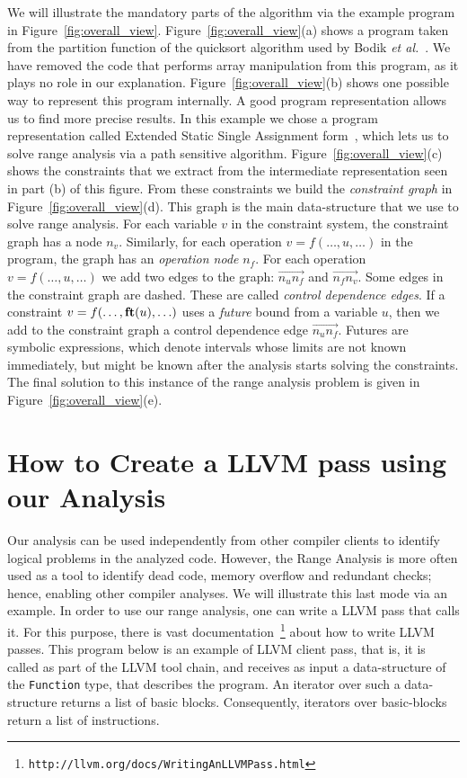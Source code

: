 \documentclass{paper}
\newcommand{\fun}[1]{\mbox{\textbf{#1}}}
\begin{document}
We will illustrate the mandatory parts of the
algorithm via the example program in Figure~\ref{fig:overall_view}.
Figure~\ref{fig:overall_view}(a) shows a program taken from the
partition function of the quicksort algorithm used by Bodik
{\em et al.}~\cite{Bodik00}.
We have removed the code that performs array manipulation from this program,
as it plays no role in our explanation.
Figure~\ref{fig:overall_view}(b) shows one possible way to represent this
program internally.
A good program representation allows us to find more precise results.
In this example we chose a program representation called
Extended Static Single Assignment form~\cite{Bodik00}, which lets us to solve
range analysis via a path sensitive algorithm.
Figure~\ref{fig:overall_view}(c) shows the constraints that we extract from
the intermediate representation seen in part (b) of this figure.
From these constraints we build the {\em constraint graph} in
Figure~\ref{fig:overall_view}(d).
This graph is the main data-structure that we use to solve range analysis.
For each variable $v$ in the constraint system, the constraint graph has a node
$n_v$.
Similarly, for each operation $v = f(\ldots, u, \ldots)$ in the program, the
graph has an {\em operation node} $n_f$.
For each operation $v = f(\ldots, u, \ldots)$ we add two edges to the
graph: $\overrightarrow{n_un_f}$ and $\overrightarrow{n_fn_v}$.
Some edges in the constraint graph are dashed.
These are called {\em control dependence edges}.
If a constraint $v = f(\ldots, \fun{ft}(u), \ldots)$ uses a {\em future}
bound from a variable $u$, then we add to the constraint graph a control
dependence edge $\overrightarrow{n_un_f}$.
Futures are symbolic expressions, which denote intervals whose limits are
not known immediately, but might be known after the analysis starts solving
the constraints.
The final solution to this instance of the range analysis problem is
given in Figure~\ref{fig:overall_view}(e).



\section{How to Create a LLVM pass using our Analysis}
\label{sec:howto}

Our analysis can be used independently from other compiler clients to identify
logical problems in the analyzed code.
However, the Range Analysis is more often used as a tool to identify dead code,
memory overflow and redundant checks; hence, enabling other compiler analyses.
We will illustrate this last mode via an example.
In order to use our range analysis, one can write a LLVM pass that calls it.
For this purpose, there is vast documentation~\footnote{\texttt{http://llvm.org/docs/WritingAnLLVMPass.html}} about how to write LLVM passes.
This program below is an example of LLVM client pass, that is, it is called as part of the LLVM
tool chain, and receives as input a data-structure of the \texttt{Function}
type, that describes the program.
An iterator over such a data-structure returns a list of basic blocks.
Consequently, iterators over basic-blocks return a list of instructions.
\end{document}
